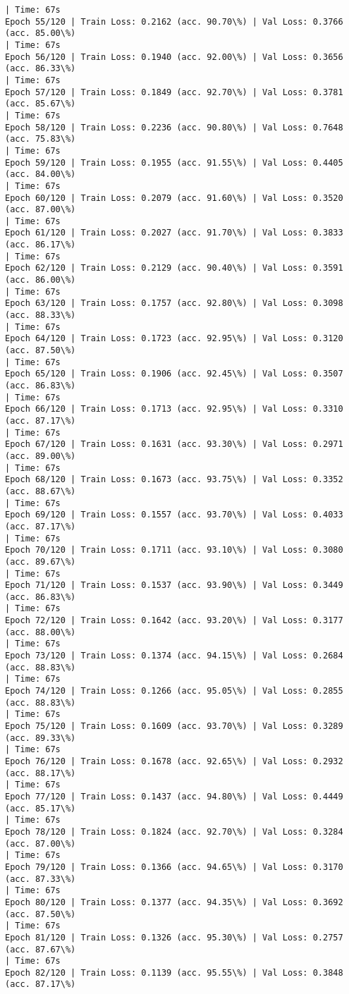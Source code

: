 \documentclass[8pt]{extarticle}
\begin{document}
\begin{Verbatim}[commandchars=\\\{\}]
| Time: 67s
Epoch 55/120 | Train Loss: 0.2162 (acc. 90.70\%) | Val Loss: 0.3766 (acc. 85.00\%)
| Time: 67s
Epoch 56/120 | Train Loss: 0.1940 (acc. 92.00\%) | Val Loss: 0.3656 (acc. 86.33\%)
| Time: 67s
Epoch 57/120 | Train Loss: 0.1849 (acc. 92.70\%) | Val Loss: 0.3781 (acc. 85.67\%)
| Time: 67s
Epoch 58/120 | Train Loss: 0.2236 (acc. 90.80\%) | Val Loss: 0.7648 (acc. 75.83\%)
| Time: 67s
Epoch 59/120 | Train Loss: 0.1955 (acc. 91.55\%) | Val Loss: 0.4405 (acc. 84.00\%)
| Time: 67s
Epoch 60/120 | Train Loss: 0.2079 (acc. 91.60\%) | Val Loss: 0.3520 (acc. 87.00\%)
| Time: 67s
Epoch 61/120 | Train Loss: 0.2027 (acc. 91.70\%) | Val Loss: 0.3833 (acc. 86.17\%)
| Time: 67s
Epoch 62/120 | Train Loss: 0.2129 (acc. 90.40\%) | Val Loss: 0.3591 (acc. 86.00\%)
| Time: 67s
Epoch 63/120 | Train Loss: 0.1757 (acc. 92.80\%) | Val Loss: 0.3098 (acc. 88.33\%)
| Time: 67s
Epoch 64/120 | Train Loss: 0.1723 (acc. 92.95\%) | Val Loss: 0.3120 (acc. 87.50\%)
| Time: 67s
Epoch 65/120 | Train Loss: 0.1906 (acc. 92.45\%) | Val Loss: 0.3507 (acc. 86.83\%)
| Time: 67s
Epoch 66/120 | Train Loss: 0.1713 (acc. 92.95\%) | Val Loss: 0.3310 (acc. 87.17\%)
| Time: 67s
Epoch 67/120 | Train Loss: 0.1631 (acc. 93.30\%) | Val Loss: 0.2971 (acc. 89.00\%)
| Time: 67s
Epoch 68/120 | Train Loss: 0.1673 (acc. 93.75\%) | Val Loss: 0.3352 (acc. 88.67\%)
| Time: 67s
Epoch 69/120 | Train Loss: 0.1557 (acc. 93.70\%) | Val Loss: 0.4033 (acc. 87.17\%)
| Time: 67s
Epoch 70/120 | Train Loss: 0.1711 (acc. 93.10\%) | Val Loss: 0.3080 (acc. 89.67\%)
| Time: 67s
Epoch 71/120 | Train Loss: 0.1537 (acc. 93.90\%) | Val Loss: 0.3449 (acc. 86.83\%)
| Time: 67s
Epoch 72/120 | Train Loss: 0.1642 (acc. 93.20\%) | Val Loss: 0.3177 (acc. 88.00\%)
| Time: 67s
Epoch 73/120 | Train Loss: 0.1374 (acc. 94.15\%) | Val Loss: 0.2684 (acc. 88.83\%)
| Time: 67s
Epoch 74/120 | Train Loss: 0.1266 (acc. 95.05\%) | Val Loss: 0.2855 (acc. 88.83\%)
| Time: 67s
Epoch 75/120 | Train Loss: 0.1609 (acc. 93.70\%) | Val Loss: 0.3289 (acc. 89.33\%)
| Time: 67s
Epoch 76/120 | Train Loss: 0.1678 (acc. 92.65\%) | Val Loss: 0.2932 (acc. 88.17\%)
| Time: 67s
Epoch 77/120 | Train Loss: 0.1437 (acc. 94.80\%) | Val Loss: 0.4449 (acc. 85.17\%)
| Time: 67s
Epoch 78/120 | Train Loss: 0.1824 (acc. 92.70\%) | Val Loss: 0.3284 (acc. 87.00\%)
| Time: 67s
Epoch 79/120 | Train Loss: 0.1366 (acc. 94.65\%) | Val Loss: 0.3170 (acc. 87.33\%)
| Time: 67s
Epoch 80/120 | Train Loss: 0.1377 (acc. 94.35\%) | Val Loss: 0.3692 (acc. 87.50\%)
| Time: 67s
Epoch 81/120 | Train Loss: 0.1326 (acc. 95.30\%) | Val Loss: 0.2757 (acc. 87.67\%)
| Time: 67s
Epoch 82/120 | Train Loss: 0.1139 (acc. 95.55\%) | Val Loss: 0.3848 (acc. 87.17\%)

\end{Verbatim}
\end{document}
